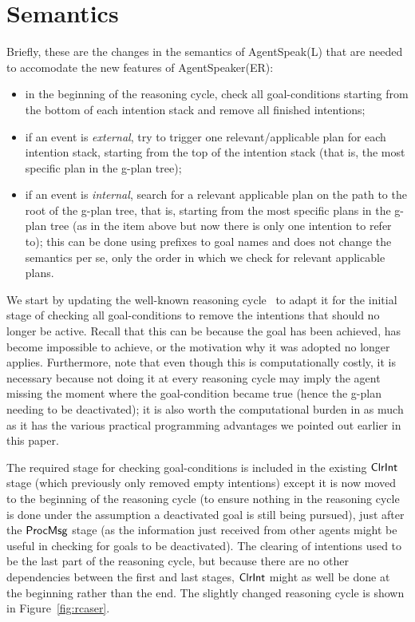 \section{Semantics}
\label{sec:formalisation}


Briefly, these are the changes in the semantics of AgentSpeak(L)
that are needed to accomodate the new features of AgentSpeaker(ER):

\begin{itemize}
\item in the beginning of the reasoning cycle, check all
  goal-conditions starting from the bottom of each intention stack and
  remove all finished intentions;

\item if an event is \emph{external}, try to trigger one
  relevant/applicable plan for each intention stack, starting from the
  top of the intention stack (that is, the most specific plan in the
  g-plan tree);

\item if an event is \emph{internal}, search for a relevant applicable
  plan on the path to the root of the g-plan tree, that is, starting
  from the most specific plans in the g-plan tree (as in the item
  above but now there is only one intention to refer to); this can be
  done using prefixes to goal names and does not change the semantics
  per se, only the order in which we check for relevant applicable
  plans.
\end{itemize}

We start by updating the well-known reasoning cycle~\cite{JasonBook}
to adapt it for the initial stage of checking all goal-conditions to remove
the intentions that should no longer be active. Recall that this can
be because the goal has been achieved, has become impossible to
achieve, or the motivation why it was adopted no longer
applies. Furthermore, note that even though this is computationally
costly, it is necessary because not doing it at every reasoning cycle
may imply the agent missing the moment where the goal-condition became
true (hence the g-plan needing to be deactivated); it is also worth
the computational burden in as much as it has the various practical
programming advantages we pointed out earlier in this paper.

The required stage for checking goal-conditions is included in the
existing $\mathsf{ClrInt}$ stage (which previously only removed empty
intentions) except it is now moved to the beginning of the reasoning
cycle (to ensure nothing in the reasoning cycle is done under the
assumption a deactivated goal is still being pursued), just after the
$\mathsf{ProcMsg}$ stage (as the information just received from other agents
might be useful in checking for goals to be deactivated). The clearing of
intentions used to be the last part of the reasoning cycle, but
because there are no other dependencies between the first and last
stages, $\mathsf{ClrInt}$ might as well be done at the beginning rather than
the end. The slightly changed reasoning cycle is shown in
Figure~\ref{fig:rcaser}.


